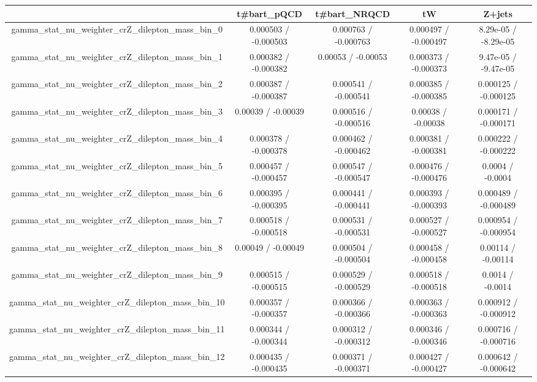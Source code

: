 \documentclass[10pt]{article}
\begin{document}
\begin{table}[htbp]
\begin{center}
\begin{tabular}{|c|c|c|c|c|}
\hline 
      & t#bar{t}_{pQCD}      & t#bar{t}_{NRQCD}      & tW      & Z+jets \\ 
\hline 
  gamma_stat_nu_weighter_crZ_dilepton_mass_bin_0 & 0.000503 / -0.000503 & 0.000763 / -0.000763 & 0.000497 / -0.000497 & 8.29e-05 / -8.29e-05 \\ 
  gamma_stat_nu_weighter_crZ_dilepton_mass_bin_1 & 0.000382 / -0.000382 & 0.00053 / -0.00053 & 0.000373 / -0.000373 & 9.47e-05 / -9.47e-05 \\ 
  gamma_stat_nu_weighter_crZ_dilepton_mass_bin_2 & 0.000387 / -0.000387 & 0.000541 / -0.000541 & 0.000385 / -0.000385 & 0.000125 / -0.000125 \\ 
  gamma_stat_nu_weighter_crZ_dilepton_mass_bin_3 & 0.00039 / -0.00039 & 0.000516 / -0.000516 & 0.00038 / -0.00038 & 0.000171 / -0.000171 \\ 
  gamma_stat_nu_weighter_crZ_dilepton_mass_bin_4 & 0.000378 / -0.000378 & 0.000462 / -0.000462 & 0.000381 / -0.000381 & 0.000222 / -0.000222 \\ 
  gamma_stat_nu_weighter_crZ_dilepton_mass_bin_5 & 0.000457 / -0.000457 & 0.000547 / -0.000547 & 0.000476 / -0.000476 & 0.0004 / -0.0004 \\ 
  gamma_stat_nu_weighter_crZ_dilepton_mass_bin_6 & 0.000395 / -0.000395 & 0.000441 / -0.000441 & 0.000393 / -0.000393 & 0.000489 / -0.000489 \\ 
  gamma_stat_nu_weighter_crZ_dilepton_mass_bin_7 & 0.000518 / -0.000518 & 0.000531 / -0.000531 & 0.000527 / -0.000527 & 0.000954 / -0.000954 \\ 
  gamma_stat_nu_weighter_crZ_dilepton_mass_bin_8 & 0.00049 / -0.00049 & 0.000504 / -0.000504 & 0.000458 / -0.000458 & 0.00114 / -0.00114 \\ 
  gamma_stat_nu_weighter_crZ_dilepton_mass_bin_9 & 0.000515 / -0.000515 & 0.000529 / -0.000529 & 0.000518 / -0.000518 & 0.0014 / -0.0014 \\ 
  gamma_stat_nu_weighter_crZ_dilepton_mass_bin_10 & 0.000357 / -0.000357 & 0.000366 / -0.000366 & 0.000363 / -0.000363 & 0.000912 / -0.000912 \\ 
  gamma_stat_nu_weighter_crZ_dilepton_mass_bin_11 & 0.000344 / -0.000344 & 0.000312 / -0.000312 & 0.000346 / -0.000346 & 0.000716 / -0.000716 \\ 
  gamma_stat_nu_weighter_crZ_dilepton_mass_bin_12 & 0.000435 / -0.000435 & 0.000371 / -0.000371 & 0.000427 / -0.000427 & 0.000642 / -0.000642 \\ 

\end{tabular}
\end{center}
\end{table}
\end{document}
